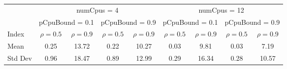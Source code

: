 \begin{tabular}{lc|c|c|c|c|c|c|c}
\toprule
& \multicolumn{4}{c|}{numCpus = 4} & \multicolumn{4}{c}{numCpus = 12} \\
& \multicolumn{2}{c|}{pCpuBound = 0.1} & \multicolumn{2}{c|}{pCpuBound = 0.9} & \multicolumn{2}{c|}{pCpuBound = 0.1} & \multicolumn{2}{c}{pCpuBound = 0.9} \\
Index & $\rho = 0.5$ & $\rho = 0.9$ & $\rho = 0.5$ & $\rho = 0.9$ & $\rho = 0.5$ & $\rho = 0.9$ & $\rho = 0.5$ & $\rho = 0.9$ \\
\midrule
Mean & 0.25 & 13.72 & 0.22 & 10.27 & 0.03 & 9.81 & 0.03 & 7.19 \\
\midrule
Std Dev & 0.96 & 18.47 & 0.89 & 12.99 & 0.29 & 16.34 & 0.28 & 10.57 \\
\bottomrule
\end{tabular}